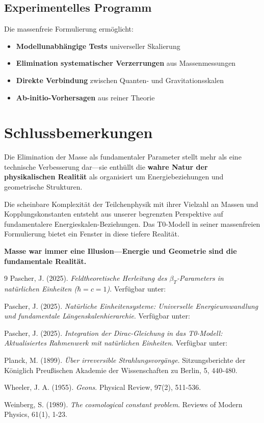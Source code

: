 	\subsection{Experimentelles Programm}
	\label{subsec:experimental_program}
	
	Die massenfreie Formulierung ermöglicht:
	
	\begin{itemize}
		\item \textbf{Modellunabhängige Tests} universeller Skalierung
		\item \textbf{Elimination systematischer Verzerrungen} aus Massenmessungen
		\item \textbf{Direkte Verbindung} zwischen Quanten- und Gravitationsskalen
		\item \textbf{Ab-initio-Vorhersagen} aus reiner Theorie
	\end{itemize}
	
	\section{Schlussbemerkungen}
	\label{sec:final_remarks}
	
	Die Elimination der Masse als fundamentaler Parameter stellt mehr als eine technische Verbesserung dar—sie enthüllt die \textbf{wahre Natur der physikalischen Realität} als organisiert um Energiebeziehungen und geometrische Strukturen. 
	
	Die scheinbare Komplexität der Teilchenphysik mit ihrer Vielzahl an Massen und Kopplungskonstanten entsteht aus unserer begrenzten Perspektive auf fundamentalere Energieskalen-Beziehungen. Das T0-Modell in seiner massenfreien Formulierung bietet ein Fenster in diese tiefere Realität.
	
	\textbf{Masse war immer eine Illusion—Energie und Geometrie sind die fundamentale Realität.}
	
	\begin{thebibliography}{9}
		Pascher, J. (2025). \textit{Feldtheoretische Herleitung des $\beta_T$-Parameters in natürlichen Einheiten ($\hbar = c = 1$)}. Verfügbar unter: 
		
		Pascher, J. (2025). \textit{Natürliche Einheitensysteme: Universelle Energieumwandlung und fundamentale Längenskalenhierarchie}. Verfügbar unter: 
		
		Pascher, J. (2025). \textit{Integration der Dirac-Gleichung in das T0-Modell: Aktualisiertes Rahmenwerk mit natürlichen Einheiten}. Verfügbar unter: 
		
		Planck, M. (1899). \textit{Über irreversible Strahlungsvorgänge}. Sitzungsberichte der Königlich Preußischen Akademie der Wissenschaften zu Berlin, 5, 440-480.
		
		Wheeler, J. A. (1955). \textit{Geons}. Physical Review, 97(2), 511-536.
		
		Weinberg, S. (1989). \textit{The cosmological constant problem}. Reviews of Modern Physics, 61(1), 1-23.
	\end{thebibliography}
	